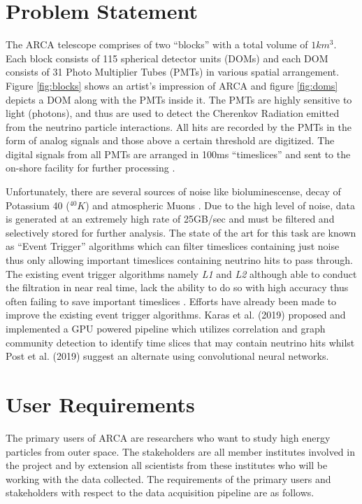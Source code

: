 \section{Problem Statement}
\label{sec:soc}

The ARCA telescope comprises of two ``blocks'' with a total volume of
$1km^{3}$. Each block consists of 115 spherical detector units (DOMs)
and each DOM consists of 31 Photo Multiplier Tubes (PMTs) in various
spatial arrangement. Figure \ref{fig:blocks} shows an artist's
impression of ARCA and figure \ref{fig:doms} depicts a DOM along with
the PMTs inside it. The PMTs are highly sensitive to light (photons),
and thus are used to detect the Cherenkov Radiation emitted from the
neutrino particle interactions. All hits are recorded by the PMTs in
the form of analog signals and those above a certain threshold are
digitized. The digital signals from all PMTs are arranged in 100ms
``timeslices'' and sent to the on-shore facility for further
processing \cite{aiello2019km3net}.

Unfortunately, there are several sources of noise like
bioluminescense, decay of Potassium 40 ($^{40}K$) and atmospheric
Muons \cite{post2019km3nnet}. Due to the high level of noise, data is
generated at an extremely high rate of 25GB/sec
\cite{adrian2016letter} and must be filtered and selectively stored
for further analysis. The state of the art for this task are known as
``Event Trigger'' algorithms \cite{adrian2016letter,aiello2019km3net}
which can filter timeslices containing just noise thus only allowing
important timeslices containing neutrino hits to pass through. The
existing event trigger algorithms namely \emph{L1} and \emph{L2}
although able to conduct the filtration in near real time, lack the
ability to do so with high accuracy thus often failing to save
important timeslices \cite{karas2019data}. Efforts have already been
made to improve the existing event trigger algorithms. Karas et al.
(2019) proposed and implemented a GPU powered pipeline which utilizes
correlation and graph community detection to identify time slices that
may contain neutrino hits whilst Post et al. (2019) suggest an
alternate using convolutional neural networks.

\section{User Requirements}
\label{sec:user-req}

The primary users of ARCA are researchers who want to study high
energy particles from outer space. The stakeholders are all member
institutes involved in the project and by extension all scientists
from these institutes who will be working with the data collected. The
requirements of the primary users and stakeholders with respect to the
data acquisition pipeline are as follows.

